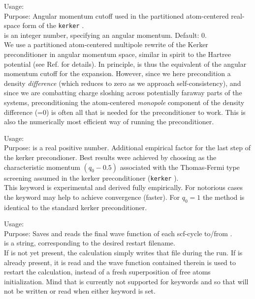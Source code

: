{
  \noindent
  Usage:   \\[1.0ex]
  Purpose: Angular momentum cutoff used in the partitioned
    atom-centered real-space form of the \texttt{kerker}
    . \\[1.0ex]
   is an integer number, specifying an angular
    momentum. Default: 0. \\
}
We use a partitioned atom-centered multipole rewrite of the Kerker
preconditioner in angular momentum space, similar in spirit to the
Hartree potential (see Ref. \cite{Blum08} for details). In principle,
 is thus the equivalent of the
 angular momentum cutoff for the expansion.
However, since
we here precondition a density \emph{difference} (which reduces to
zero as we approach self-consistency), and since we are combatting
charge sloshing across potentially faraway parts of the systems,
preconditioning the atom-centered \emph{monopole} component of the
density difference (=0) is often all that is needed
for the preconditioner to work. This is also the numerically most
efficient way of running the preconditioner.

{
  \noindent
  Usage:   \\[1.0ex]
  Purpose:  is a real
        positive number. Additional empirical factor for the last
        step of the kerker precondioner. Best results were achieved by
        choosing  as the characteristic momentum $(q_0-0.5)$
        associated with the Thomas-Fermi type screening assumed in the
        kerker preconditioner (\texttt{kerker}
    ). \\[1.0ex]
}
This keyword is experimental and derived fully empirically. For notorious cases
the keyword may help to achieve convergence (faster). For $q_0=1$ the method is
identical to the standard kerker preconditioner.

{
  \noindent
  Usage:   \\[1.0ex]
  Purpose: Saves and reads the final wave function of each scf-cycle
    to/from .\\[1.0ex]
   is a string, corresponding to the desired restart filename. \\
}
If  is not yet present, the calculation simply writes
that file during the run. If  is already present, it is
read and the wave function contained therein is used to restart the
calculation, instead of a fresh superposition of free atoms
initialization. Mind that  is currently not supported for
keywords  and 
so that  will not be written or read when either keyword is
set.

